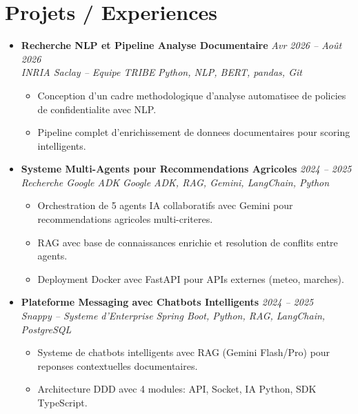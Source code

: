 \documentclass[a4paper,11pt]{article}
\begin{document}
\section{Projets / Experiences}
\begin{itemize}[leftmargin=*, label={-}]

\item \textbf{Recherche NLP et Pipeline Analyse Documentaire} \hfill \textit{Avr 2026 -- Ao\^ut 2026} \\
\textit{INRIA Saclay -- Equipe TRIBE} \hfill \textit{Python, NLP, BERT, pandas, Git}
\vspace{-2pt}
    \begin{itemize}[leftmargin=0.4cm, nosep, label=\tiny$\bullet$]
        \item \small{Conception d'un cadre methodologique d'analyse automatisee de policies de confidentialite avec NLP.}
        \item \small{Pipeline complet d'enrichissement de donnees documentaires pour scoring intelligents.}
    \end{itemize}
\vspace{3pt}

\item \textbf{Systeme Multi-Agents pour Recommendations Agricoles} \hfill \textit{2024 -- 2025} \\
\textit{Recherche Google ADK} \hfill \textit{Google ADK, RAG, Gemini, LangChain, Python}
\vspace{-2pt}
    \begin{itemize}[leftmargin=0.4cm, nosep, label=\tiny$\bullet$]
        \item \small{Orchestration de 5 agents IA collaboratifs avec Gemini pour recommendations agricoles multi-criteres.}
        \item \small{RAG avec base de connaissances enrichie et resolution de conflits entre agents.}
        \item \small{Deployment Docker avec FastAPI pour APIs externes (meteo, marches).}
    \end{itemize}
\vspace{3pt}

\item \textbf{Plateforme Messaging avec Chatbots Intelligents} \hfill \textit{2024 -- 2025} \\
\textit{Snappy -- Systeme d'Enterprise} \hfill \textit{Spring Boot, Python, RAG, LangChain, PostgreSQL}
\vspace{-2pt}
    \begin{itemize}[leftmargin=0.4cm, nosep, label=\tiny$\bullet$]
        \item \small{Systeme de chatbots intelligents avec RAG (Gemini Flash/Pro) pour reponses contextuelles documentaires.}
        \item \small{Architecture DDD avec 4 modules: API, Socket, IA Python, SDK TypeScript.}
    \end{itemize}
\vspace{3pt}


\end{itemize}
\end{document}
